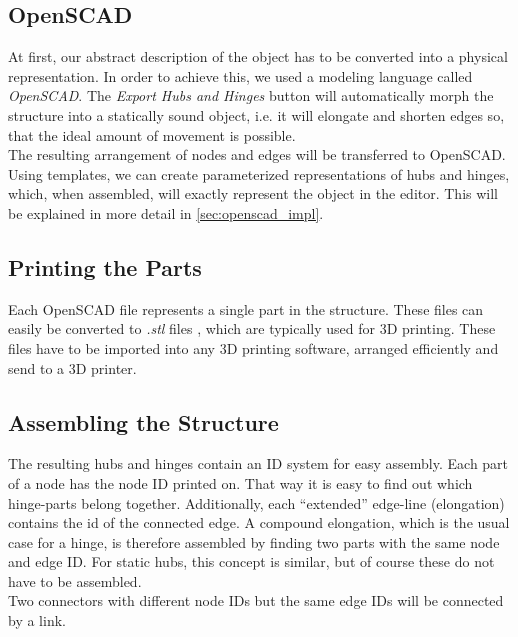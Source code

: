 \subsection{OpenSCAD}
At first, our abstract description of the object has to be converted into a physical representation. In order to achieve this, we used a modeling language called \textit{OpenSCAD}. The \textit{Export Hubs and Hinges} button will automatically morph the structure into a statically sound object, i.e. it will elongate and shorten edges so, that the ideal amount of movement is possible. \\
The resulting arrangement of nodes and edges will be transferred to OpenSCAD. Using templates, we can create parameterized representations of hubs and hinges, which, when assembled, will exactly represent the object in the editor. This will be explained in more detail in \ref{sec:openscad_impl}.
\subsection{Printing the Parts}
Each OpenSCAD file represents a single part in the structure. These files can easily be converted to \textit{.stl} files , which are typically used for 3D printing. These files have to be imported into any 3D printing software, arranged efficiently and send to a 3D printer. 
\subsection{Assembling the Structure}
The resulting hubs and hinges contain an ID system for easy assembly. Each part of a node has the node ID printed on. That way it is easy to find out which hinge-parts belong together. Additionally, each ``extended'' edge-line (elongation)  contains the id of the connected edge. A compound elongation, which is the usual case for a hinge, is therefore assembled by finding two parts with the same node and edge ID. For static hubs, this concept is similar, but of course these do not have to be assembled.\\
Two connectors with different node IDs but the same edge IDs will be connected by a link.
